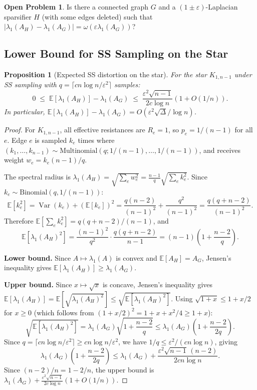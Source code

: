\documentclass[11pt]{article}
\newtheorem{proposition}[theorem]{Proposition}
\theoremstyle{definition}
\newtheorem{openproblem}[theorem]{Open Problem}
\newcommand{\eps}{\varepsilon}
\newcommand{\lamH}{\lambda_1(A_H)}
\newcommand{\lamG}{\lambda_1(A_G)}
\newcommand{\AG}{A_G}
\newcommand{\AH}{A_H}
\newcommand{\E}{\mathbb{E}}
\DeclareMathOperator{\Var}{Var}
\begin{document}
\begin{openproblem}\label{op:genuine}
Is there a connected graph $G$ and a $(1\pm\eps)$-Laplacian
sparsifier $H$ (with some edges deleted) such that $|\lamH - \lamG| = \omega(\eps\lamG)$?
\end{openproblem}

\subsection{Lower Bound for SS Sampling on the Star}

\begin{proposition}[Expected SS distortion on the star]\label{prop:star-ss}
For the star $K_{1,n-1}$ under SS sampling with $q = \lceil cn\log n/\eps^2\rceil$
samples:
\[
0 \;\leq\; \E[\lamH] - \lamG
\;\leq\; \frac{\eps^2\sqrt{n-1}}{2c\log n}\!\left(1 + O(1/n)\right).
\]
In particular, $\E[\lamH] - \lamG = O(\eps^2\sqrt{\Delta}/\log n)$.
\end{proposition}

\begin{proof}
For $K_{1,n-1}$, all effective resistances are $R_e = 1$, so
$p_e = 1/(n-1)$ for all $e$. Edge $e$ is sampled $k_e$ times where
$(k_1, \ldots, k_{n-1}) \sim \mathrm{Multinomial}(q; 1/(n-1), \ldots, 1/(n-1))$,
and receives weight $w_e = k_e(n-1)/q$.

The spectral radius is $\lamH = \sqrt{\sum_e w_e^2} = \frac{n-1}{q}\sqrt{\sum_e k_e^2}$.
Since $k_e \sim \mathrm{Binomial}(q, 1/(n-1))$:
\[
\E[k_e^2] = \Var(k_e) + (\E[k_e])^2
= \frac{q(n-2)}{(n-1)^2} + \frac{q^2}{(n-1)^2}
= \frac{q(q+n-2)}{(n-1)^2}.
\]
Therefore
$\E[\sum_e k_e^2] = q(q+n-2)/(n-1)$,
and
\[
\E[\lamH^2] = \frac{(n-1)^2}{q^2} \cdot \frac{q(q+n-2)}{n-1}
= (n-1)\!\left(1 + \frac{n-2}{q}\right).
\]

\medskip\noindent\textbf{Lower bound.}
Since $A \mapsto \lambda_1(A)$ is convex and $\E[\AH] = \AG$, Jensen's inequality gives
$\E[\lamH] \geq \lamG$.

\medskip\noindent\textbf{Upper bound.}
Since $x \mapsto \sqrt{x}$ is concave, Jensen's inequality gives
$\E[\lamH] = \E[\sqrt{\lamH^2}] \leq \sqrt{\E[\lamH^2]}$.
Using $\sqrt{1 + x} \leq 1 + x/2$ for $x \geq 0$
(which follows from $(1+x/2)^2 = 1 + x + x^2/4 \geq 1 + x$):
\[
\sqrt{\E[\lamH^2]}
= \lamG\sqrt{1 + \frac{n-2}{q}}
\leq \lamG\!\left(1 + \frac{n-2}{2q}\right).
\]
Since $q = \lceil cn\log n/\eps^2 \rceil \geq cn\log n/\eps^2$, we have
$1/q \leq \eps^2/(cn\log n)$, giving
\[
\lamG\!\left(1 + \frac{n-2}{2q}\right)
\leq \lamG + \frac{\eps^2\sqrt{n-1}\,(n-2)}{2cn\log n}.
\]
Since $(n-2)/n = 1 - 2/n$, the upper bound is
$\lamG + \frac{\eps^2\sqrt{n-1}}{2c\log n}(1 + O(1/n))$.
\end{proof}
\end{document}
